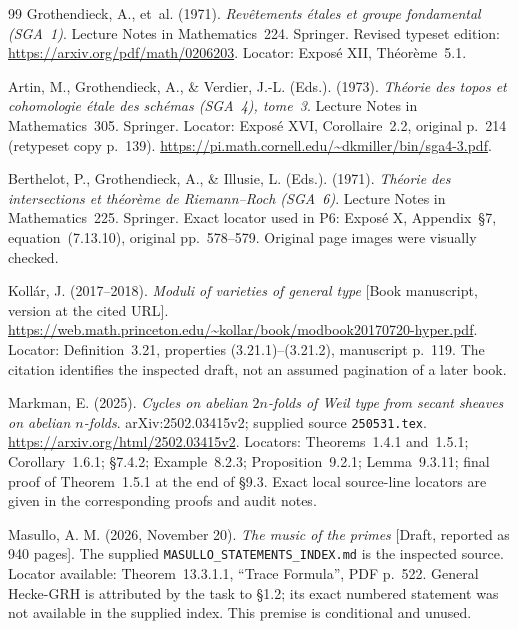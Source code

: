 \documentclass[11pt,a4paper]{article}
\theoremstyle{definition}\newtheorem{definition}[theorem]{Definition}
\theoremstyle{remark}\newtheorem{remark}[theorem]{Remark}
\begin{document}
\begin{thebibliography}{99}
Grothendieck, A., et~al. (1971). \emph{Rev\^etements \'etales et groupe fondamental (SGA~1)}. Lecture Notes in Mathematics~224. Springer. Revised typeset edition: \url{https://arxiv.org/pdf/math/0206203}. Locator: Expos\'e XII, Th\'eor\`eme~5.1.

Artin, M., Grothendieck, A., \& Verdier, J.-L. (Eds.). (1973). \emph{Th\'eorie des topos et cohomologie \'etale des sch\'emas (SGA~4), tome~3}. Lecture Notes in Mathematics~305. Springer. Locator: Expos\'e XVI, Corollaire~2.2, original p.~214 (retypeset copy p.~139). \url{https://pi.math.cornell.edu/~dkmiller/bin/sga4-3.pdf}.

Berthelot, P., Grothendieck, A., \& Illusie, L. (Eds.). (1971). \emph{Th\'eorie des intersections et th\'eor\`eme de Riemann--Roch (SGA~6)}. Lecture Notes in Mathematics~225. Springer. Exact locator used in P6: Expos\'e X, Appendix~\S7, equation~(7.13.10), original pp.~578--579. Original page images were visually checked.

Koll\'ar, J. (2017--2018). \emph{Moduli of varieties of general type} [Book manuscript, version at the cited URL]. \url{https://web.math.princeton.edu/~kollar/book/modbook20170720-hyper.pdf}. Locator: Definition~3.21, properties (3.21.1)--(3.21.2), manuscript p.~119. The citation identifies the inspected draft, not an assumed pagination of a later book.

Markman, E. (2025). \emph{Cycles on abelian $2n$-folds of Weil type from secant sheaves on abelian $n$-folds}. arXiv:2502.03415v2; supplied source \texttt{250531.tex}. \url{https://arxiv.org/html/2502.03415v2}. Locators: Theorems~1.4.1 and~1.5.1; Corollary~1.6.1; \S7.4.2; Example~8.2.3; Proposition~9.2.1; Lemma~9.3.11; final proof of Theorem~1.5.1 at the end of \S9.3. Exact local source-line locators are given in the corresponding proofs and audit notes.

Masullo, A. M. (2026, November 20). \emph{The music of the primes} [Draft, reported as 940 pages]. The supplied \texttt{MASULLO\_STATEMENTS\_INDEX.md} is the inspected source. Locator available: Theorem~13.3.1.1, ``Trace Formula'', PDF p.~522. General Hecke-GRH is attributed by the task to \S1.2; its exact numbered statement was not available in the supplied index. This premise is conditional and unused.


\end{thebibliography}
\end{document}
